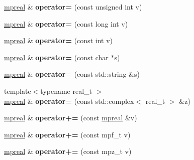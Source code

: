 \begin{DoxyCompactItemize}
\item 
\mbox{\label{classmpfr_1_1mpreal_a6bf853df98f85a3dffe25d3559369163}} 
\hyperlink{classmpfr_1_1mpreal}{mpreal} \& {\bfseries operator=} (const unsigned int v)
\item 
\mbox{\label{classmpfr_1_1mpreal_a31e517482686fa0a4fa6cea4d5e445c0}} 
\hyperlink{classmpfr_1_1mpreal}{mpreal} \& {\bfseries operator=} (const long int v)
\item 
\mbox{\label{classmpfr_1_1mpreal_a6f4c6e29a98fece6d7422fcf94f59230}} 
\hyperlink{classmpfr_1_1mpreal}{mpreal} \& {\bfseries operator=} (const int v)
\item 
\mbox{\label{classmpfr_1_1mpreal_a6ac45a50f5e74ce3fa616326e924daf3}} 
\hyperlink{classmpfr_1_1mpreal}{mpreal} \& {\bfseries operator=} (const char $\ast$s)
\item 
\mbox{\label{classmpfr_1_1mpreal_a6eb08aa12d016751003ba7a6441311fb}} 
\hyperlink{classmpfr_1_1mpreal}{mpreal} \& {\bfseries operator=} (const std\+::string \&s)
\item 
\mbox{\label{classmpfr_1_1mpreal_a53d576213a366d6eade2db942779370c}} 
{\footnotesize template$<$typename real\+\_\+t $>$ }\\\hyperlink{classmpfr_1_1mpreal}{mpreal} \& {\bfseries operator=} (const std\+::complex$<$ real\+\_\+t $>$ \&z)
\item 
\mbox{\label{classmpfr_1_1mpreal_a599bc5e3105572a45d929000a85045b9}} 
\hyperlink{classmpfr_1_1mpreal}{mpreal} \& {\bfseries operator+=} (const \hyperlink{classmpfr_1_1mpreal}{mpreal} \&v)
\item 
\mbox{\label{classmpfr_1_1mpreal_a11fd44a6fe5b15dd2e8d96c5f65f0b59}} 
\hyperlink{classmpfr_1_1mpreal}{mpreal} \& {\bfseries operator+=} (const mpf\+\_\+t v)
\item 
\mbox{\label{classmpfr_1_1mpreal_af358241f7202834d8ad23023022bdfdd}} 
\hyperlink{classmpfr_1_1mpreal}{mpreal} \& {\bfseries operator+=} (const mpz\+\_\+t v)
\item 

\end{DoxyCompactItemize}
